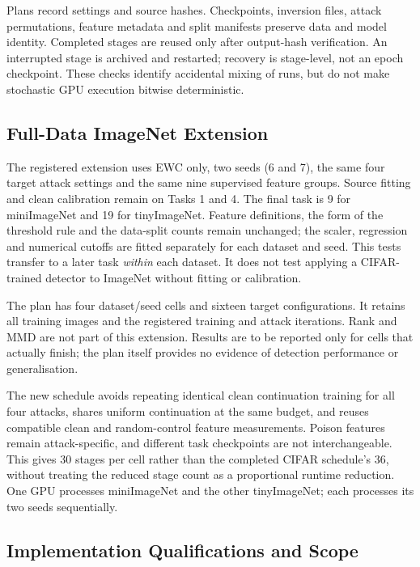 Plans record settings and source hashes. Checkpoints, inversion files,
attack permutations, feature metadata and split manifests preserve data
and model identity. Completed stages are reused only after output-hash
verification. An interrupted stage is archived and restarted; recovery
is stage-level, not an epoch checkpoint. These checks identify accidental
mixing of runs, but do not make stochastic GPU execution bitwise
deterministic.

\subsection{Full-Data ImageNet Extension}
\label{subsec:setup-extension}

The registered extension uses EWC only, two seeds (6 and 7), the same four
target attack settings and the same nine supervised feature groups.
Source fitting and clean calibration remain on Tasks 1 and 4. The final
task is 9 for miniImageNet and 19 for tinyImageNet. Feature definitions,
the form of the threshold rule and the data-split counts remain unchanged;
the scaler, regression and numerical cutoffs are fitted separately for
each dataset and seed. This tests transfer to a later task \emph{within}
each dataset. It does not test applying a CIFAR-trained detector to
ImageNet without fitting or calibration.

The plan has four dataset/seed cells and sixteen target configurations.
It retains all training images and the registered training and attack
iterations. Rank and MMD are not part of this extension. Results are to be
reported only for cells that actually finish; the plan itself provides
no evidence of detection performance or generalisation.

The new schedule avoids repeating identical clean continuation training
for all four attacks, shares uniform continuation at the same budget,
and reuses compatible clean and random-control feature measurements.
Poison features remain attack-specific, and different task checkpoints
are not interchangeable. This gives 30 stages per cell rather than the
completed CIFAR schedule's 36, without treating the reduced stage count
as a proportional runtime reduction. One GPU processes miniImageNet and
the other tinyImageNet; each processes its two seeds sequentially.

\subsection{Implementation Qualifications and Scope}
\label{subsec:setup-validity}

